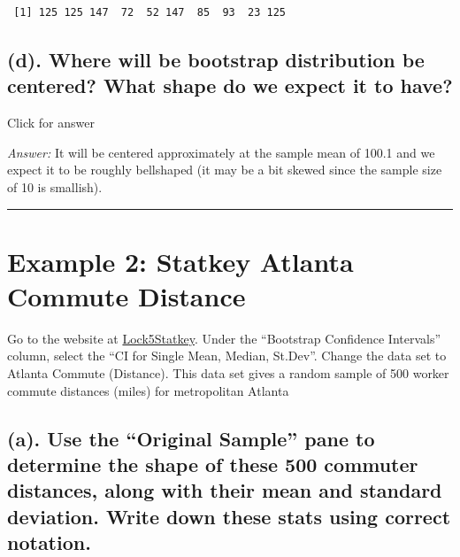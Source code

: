 \documentclass[
]{book}
\begin{document}
\begin{verbatim}
 [1] 125 125 147  72  52 147  85  93  23 125
\end{verbatim}

\hypertarget{d.-where-will-be-bootstrap-distribution-be-centered-what-shape-do-we-expect-it-to-have}{%
\subsection{(d). Where will be bootstrap distribution be centered? What shape do we expect it to have?}\label{d.-where-will-be-bootstrap-distribution-be-centered-what-shape-do-we-expect-it-to-have}}

Click for answer

\emph{Answer:} It will be centered approximately at the sample mean of 100.1 and we expect it to be roughly bellshaped (it may be a bit skewed since the sample size of 10 is smallish).

\begin{center}\rule{0.5\linewidth}{0.5pt}\end{center}

\hypertarget{example-2-statkey-atlanta-commute-distance}{%
\section{Example 2: Statkey Atlanta Commute Distance}\label{example-2-statkey-atlanta-commute-distance}}

Go to the website at \href{http://www.lock5stat.com/StatKey/}{Lock5Statkey}. Under the ``Bootstrap Confidence Intervals'' column, select the ``CI for Single Mean, Median, St.Dev''. Change the data set to Atlanta Commute (Distance). This data set gives a random sample of 500 worker commute distances (miles) for metropolitan Atlanta

\hypertarget{a.-use-the-original-sample-pane-to-determine-the-shape-of-these-500-commuter-distances-along-with-their-mean-and-standard-deviation.-write-down-these-stats-using-correct-notation.}{%
\subsection{(a). Use the ``Original Sample'' pane to determine the shape of these 500 commuter distances, along with their mean and standard deviation. Write down these stats using correct notation.}\label{a.-use-the-original-sample-pane-to-determine-the-shape-of-these-500-commuter-distances-along-with-their-mean-and-standard-deviation.-write-down-these-stats-using-correct-notation.}}
\end{document}
